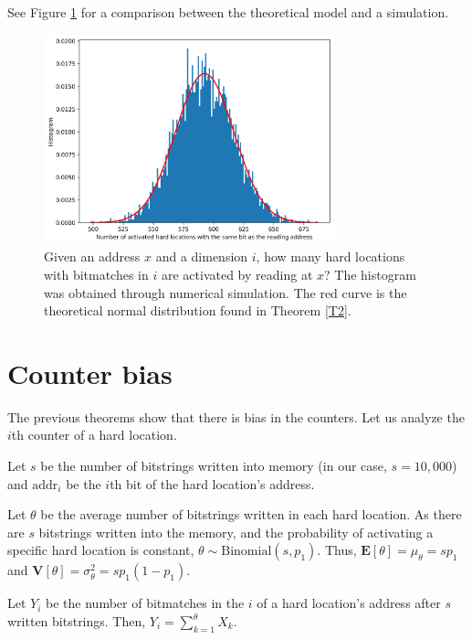 See Figure \ref{fig:sdm-same-bit-histogram} for a comparison between the theoretical model and a simulation.

\begin{figure}[h!]
  \centering
  \includegraphics[width=0.75\textwidth]{./images02/autocorrelation/same-bit-histogram.png}

  \caption{Given an address $x$ and a dimension $i$, how many hard locations with bitmatches in $i$ are activated by reading at $x$?  The histogram was obtained through numerical simulation. The red curve is the theoretical normal distribution found in Theorem \ref{T2}.}
  \label{fig:sdm-same-bit-histogram}
\end{figure}

\section{Counter bias}

The previous theorems show that there is bias in the counters. Let us analyze the $i$th counter of a hard location.

Let $s$ be the number of bitstrings written into memory (in our case, $s=10,000$) and $\text{addr}_i$ be the $i$th bit of the hard location's address.

Let $\theta$ be the average number of bitstrings written in each hard location. As there are $s$ bitstrings written into the memory, and the probability of activating a specific hard location is constant, $\theta \sim \text{Binomial}(s, p_1)$. Thus, $\mathbf{E}[\theta] = \mu_\theta = s p_1$ and $\mathbf{V}[\theta] = \sigma^2_\theta = s p_1 (1 - p_1)$.

Let $Y_i$ be the number of bitmatches in the $i$ of a hard location's address after $s$ written bitstrings. Then, $Y_i = \sum_{k=1}^{\theta} X_k$.

